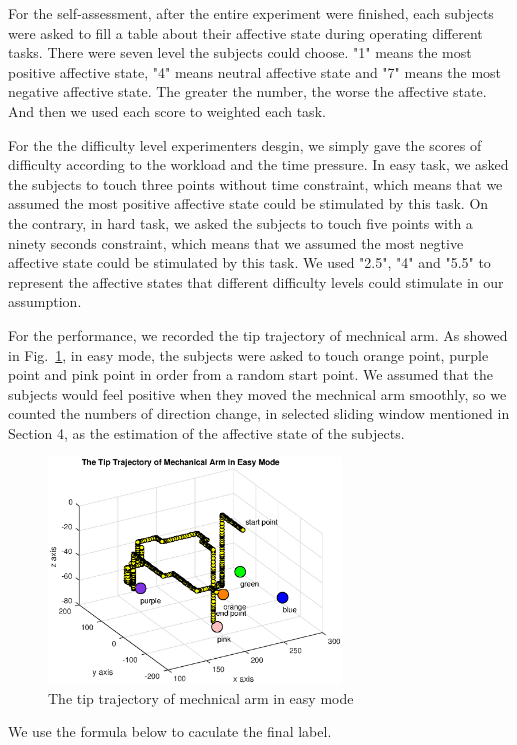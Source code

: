 \documentclass[runningheads,a4paper]{llncs}
\begin{document}
For the self-assessment, after the entire experiment were finished,
each subjects were asked to fill a table about their affective state during
operating different tasks. There were seven level the subjects could choose.
"1" means the most positive affective state, "4" means neutral affective state and
"7" means the most negative affective state. The greater the number, the worse the
affective state. And then we used each score to weighted each task.

For the the difficulty level experimenters desgin, we simply gave the scores of
difficulty according to the workload and the time pressure. In easy task, we
asked the subjects to touch three points without time constraint, which means that
we assumed the most positive affective state could be stimulated by this task.
On the contrary, in hard task, we asked the subjects to touch five points with a ninety seconds
constraint, which means that we assumed the most negtive affective state could be stimulated by
this task. We used "2.5", "4" and "5.5" to represent the affective states that different difficulty levels
could stimulate in our assumption.

For the performance, we recorded the tip trajectory of mechnical arm. As showed
in Fig.~\ref{fig:track}, in easy mode, the subjects were asked to touch orange
point, purple point and pink point in order from a random start point. We assumed
that the subjects would feel positive when they moved the mechnical arm smoothly,
so we counted the numbers of direction change, in selected sliding window
mentioned in Section 4, as the estimation of the affective state of the subjects.

\begin{figure}
  \centering
  \includegraphics[height=6cm]{images/14}
  \caption{The tip trajectory of mechnical arm in easy mode}
  \label{fig:track}
\end{figure}

We use the formula below to caculate the final label.
\end{document}
